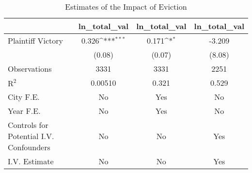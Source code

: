 \begin{table}[htbp]\centering
\def\sym#1{\ifmmode^{#1}\else\(^{#1}\)\fi}
\caption{Estimates of the Impact of Eviction}
\begin{tabular}{l*{3}{c}}
\toprule
                    &\multicolumn{1}{c}{ln\_total\_val}&\multicolumn{1}{c}{ln\_total\_val}&\multicolumn{1}{c}{ln\_total\_val}\\
\midrule
Plaintiff Victory   &       0.326\sym{***}&       0.171\sym{*}  &      -3.209         \\
                    &      (0.08)         &      (0.07)         &      (8.08)         \\
\midrule
Observations        &        3331         &        3331         &        2251         \\
$\text{R}^2$        &     0.00510         &       0.321         &       0.529         \\
City F.E.           &          No         &         Yes         &          No         \\
Year F.E.           &          No         &         Yes         &          No         \\
Controls for Potential I.V. Confounders&          No         &          No         &         Yes         \\
I.V. Estimate       &          No         &          No         &         Yes         \\
\bottomrule
\end{tabular}
\end{table}
